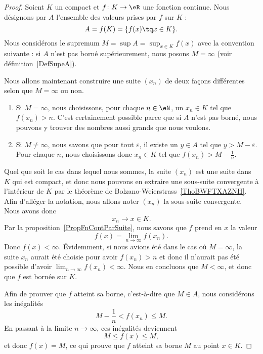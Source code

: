 \begin{proof}
	Soient \( K\) un compact et \( f\colon K\to \eR\) une fonction continue. Nous désignons par \( A\) l'ensemble des valeurs prises par \( f\) sur \( K\) :
	\begin{equation}
		A=f(K)=\{ f(x)\tq x\in K \}.
	\end{equation}
	Nous considérons le supremum $M=\sup A=\sup_{x\in K}f(x)$ avec la convention suivante : si $A$ n'est pas borné supérieurement, nous posons $M=\infty$ (voir définition~\ref{DefSupeA}).

	Nous allons maintenant construire une suite $(x_n)$ de deux façons différentes selon que $M=\infty$ ou non.
	\begin{enumerate}
		\item
		      Si \( M=\infty\), nous choisissons, pour chaque $n\in\eN$, un $x_n\in K$ tel que $f(x_n)>n$. C'est certainement possible parce que si $A$ n'est pas borné, nous pouvons y trouver des nombres aussi grands que nous voulons.
		\item
		      Si \( M\neq\infty\), nous savons que pour tout $\varepsilon$, il existe un $y\in A$ tel que $y>M-\varepsilon$. Pour chaque $n$, nous choisissons donc $x_n\in K$ tel que $f(x_n)>M-\frac{1}{ n }$.
	\end{enumerate}
	Quel que soit le cas dans lequel nous sommes, la suite $(x_n)$ est une suite dans $K$ qui est compact, et donc nous pouvons en extraire une sous-suite convergente à l'intérieur de \( K\) par le théorème de Bolzano-Weierstrass~\ref{ThoBWFTXAZNH}. Afin d'alléger la notation, nous allons noter $(x_n)$ la sous-suite convergente. Nous avons donc
	\begin{equation}
		x_n\to x\in K.
	\end{equation}
	Par la proposition~\ref{PropFnContParSuite}, nous savons que $f$ prend en \( x\) la valeur
	\begin{equation}
		f(x)=\lim_{n\to \infty} f(x_n).
	\end{equation}
	Donc $f(x)<\infty$. Évidemment, si nous avions été dans le cas où $M=\infty$, la suite $x_n$ aurait été choisie pour avoir $f(x_n)>n$ et donc il n'aurait pas été possible d'avoir $\lim_{n\to \infty} f(x_n)<\infty$. Nous en concluons que $M<\infty$, et donc que $f$ est bornée sur $K$.

	Afin de prouver que $f$ atteint sa borne, c'est-à-dire que $M\in A$, nous considérons les inégalités
	\begin{equation}
		M-\frac{1}{ n }<f(x_n)\leq M.
	\end{equation}
	En passant à la limite $n\to \infty$, ces inégalités deviennent
	\begin{equation}
		M\leq f(x)\leq M,
	\end{equation}
	et donc $f(x)=M$, ce qui prouve que $f$ atteint sa borne $M$ au point $x\in K$.
\end{proof}

